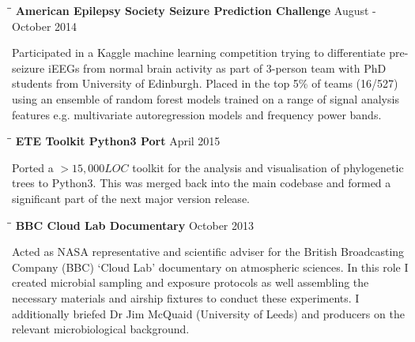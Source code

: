 \documentclass{res}
\begin{document}
\begin{resume}
   \vspace{-0.15in} 
   \begin{tabbing}
   \hspace{2in}\= \hspace{2.6in}\= \kill 
   {\bf American Epilepsy Society Seizure Prediction Challenge} \> \>        August - October 2014\\
     \end{tabbing}\vspace{-20pt}      
     Participated in a Kaggle machine learning competition trying to differentiate pre-seizure iEEGs from normal brain activity as part of 3-person team with PhD students from University of Edinburgh. 
     Placed in the top 5\% of teams (16/527) using an ensemble of random forest models trained on a range of signal analysis features e.g. multivariate autoregression models and frequency power bands.

     \vspace{-0.15in}
   \begin{tabbing}
   \hspace{2in}\= \hspace{2.6in}\= \kill 
    {\bf ETE Toolkit Python3 Port} \> \>        April 2015\\
     \end{tabbing}\vspace{-20pt}      
     Ported a \(>15,000 LOC\) toolkit for the
     analysis and visualisation of phylogenetic trees to Python3.  This was merged back into the main
     codebase and formed a significant part of 
     the next major version release.
   \vspace{-0.1in} 

   \begin{tabbing}
   \hspace{2in}\= \hspace{2.6in}\= \kill 
    {\bf BBC Cloud Lab Documentary} \> \>        October 2013\\
     \end{tabbing}\vspace{-20pt}      
     Acted as NASA representative and scientific adviser for the British Broadcasting Company (BBC) `Cloud Lab' documentary on atmospheric sciences. In this role I created microbial sampling and exposure protocols as well assembling the necessary materials and airship fixtures to conduct these experiments. I additionally briefed Dr Jim McQuaid (University of Leeds) and producers on the relevant microbiological background. 


\end{resume}
\end{document}
